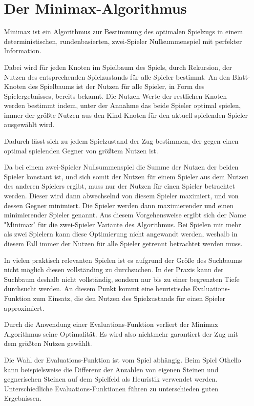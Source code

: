 \section{Der Minimax-Algorithmus}

Minimax ist ein Algorithmus zur Bestimmung des optimalen Spielzugs in einem deterministischen, rundenbasierten, zwei-Spieler Nullsummenspiel mit perfekter Information.

Dabei wird für jeden Knoten im Spielbaum des Spiels, durch Rekursion, der Nutzen des entsprechenden Spielzustands für alle Spieler bestimmt.
An den Blatt-Knoten des Spielbaums ist der Nutzen für alle Spieler, in Form des Spielergebnisses, bereits bekannt.
Die Nutzen-Werte der restlichen Knoten werden bestimmt indem, unter der Annahme das beide Spieler optimal spielen, immer der größte Nutzen aus den Kind-Knoten für den aktuell spielenden Spieler ausgewählt wird.
\cite[S.~165]{ai2010russel}

Dadurch lässt sich zu jedem Spielzustand der Zug bestimmen, der gegen einen optimal spielenden Gegner von größtem Nutzen ist.

Da bei einem zwei-Spieler Nullsummenspiel die Summe der Nutzen der beiden Spieler konstant ist, und sich somit der Nutzen für einem Spieler aus dem Nutzen des anderen Spielers ergibt, muss nur der Nutzen
für einen Spieler betrachtet werden. Dieser wird dann abwechselnd von diesem Spieler maximiert, und von dessen Gegner minimiert. Die Spieler werden dann maximierender und einen minimierender Spieler genannt.
Aus diesem Vorgehensweise ergibt sich der Name "Minimax" für die zwei-Spieler Variante des Algorithmus.
Bei Spielen mit mehr als zwei Spielern kann diese Optimierung nicht angewandt werden, weshalb in diesem Fall immer der Nutzen für alle Spieler getrennt betrachtet werden muss.
\cite[S.~165]{ai2010russel}

In vielen praktisch relevanten Spielen ist es aufgrund der Größe des Suchbaums nicht möglich diesen vollständing zu durchsuchen.
In der Praxis kann der Suchbaum deshalb nicht vollständig, sondern nur bis zu einer begrenzten Tiefe durchsucht werden. An diesem Punkt kommt eine heuristische Evaluations-Funktion zum Einsatz,
die den Nutzen des Spielzustands für einen Spieler approximiert.
\cite[S.~171]{ai2010russel}

Durch die Anwendung einer Evaluations-Funktion verliert der Minimax Algorithmus seine Optimalität. Es wird also nichtmehr garantiert der Zug mit dem größten Nutzen gewählt.

Die Wahl der Evaluations-Funktion ist vom Spiel abhängig. Beim Spiel Othello kann beispielsweise die Differenz der Anzahlen von eigenen Steinen und gegnerischen Steinen auf dem Spielfeld als Heuristik verwendet werden.
Unterschiedliche Evaluations-Funktionen führen zu unterschieden guten Ergebnissen.


